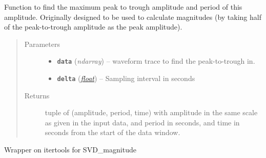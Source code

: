 \documentclass[a4paper,10pt,english]{sphinxmanual}
\begin{document}
\begin{fulllineitems}
\label{submodules/utils.mag_calc:mag_calc._max_p2t}
Function to find the maximum peak to trough amplitude and period of this
amplitude.  Originally designed to be used to calculate magnitudes (by
taking half of the peak-to-trough amplitude as the peak amplitude).
\begin{quote}\begin{description}
\item[{Parameters}] \leavevmode\begin{itemize}
\item {} 
\textbf{\texttt{data}} (\emph{ndarray}) -- waveform trace to find the peak-to-trough in.

\item {} 
\textbf{\texttt{delta}} (\href{https://docs.python.org/library/functions.html\#float}{\emph{float}}) -- Sampling interval in seconds

\end{itemize}

\item[{Returns}] \leavevmode
tuple of (amplitude, period, time) with amplitude in the same scale as
given in the input data, and period in seconds, and time in seconds
from the start of the data window.

\end{description}\end{quote}

\end{fulllineitems}


\begin{fulllineitems}
\label{submodules/utils.mag_calc:mag_calc._pairwise}
Wrapper on itertools for SVD\_magnitude

\end{fulllineitems}

\end{document}
